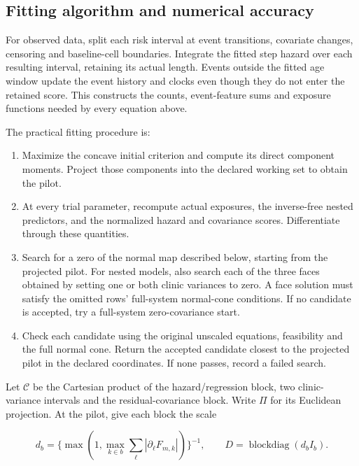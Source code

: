 \documentclass[11pt]{article}
\begin{document}
\subsection{Fitting algorithm and numerical accuracy}\label{sec:3.7}

For observed data, split each risk interval at event transitions, covariate changes, censoring and baseline-cell boundaries. Integrate the fitted step hazard over each resulting interval, retaining its actual length. Events outside the fitted age window update the event history and clocks even though they do not enter the retained score. This constructs the counts, event-feature sums and exposure functions needed by every equation above.

The practical fitting procedure is:

\begin{enumerate}
  \item Maximize the concave initial criterion and compute its direct component moments. Project those components into the declared working set to obtain the pilot.
  \item At every trial parameter, recompute actual exposures, the inverse-free nested predictors, and the normalized hazard and covariance scores. Differentiate through these quantities.
  \item Search for a zero of the normal map described below, starting from the projected pilot. For nested models, also search each of the three faces obtained by setting one or both clinic variances to zero. A face solution must satisfy the omitted rows' full-system normal-cone conditions. If no candidate is accepted, try a full-system zero-covariance start.
  \item Check each candidate using the original unscaled equations, feasibility and the full normal cone. Return the accepted candidate closest to the projected pilot in the declared coordinates. If none passes, record a failed search.
\end{enumerate}

Let \(\mathcal C\) be the Cartesian product of the hazard/regression block, two clinic-variance intervals and the residual-covariance block. Write \(\Pi\) for its Euclidean projection. At the pilot, give each block the scale

\begin{equation*}
d_b=\{\max(1,\max_{k\in b}\sum_\ell |\partial_\ell F_{m,k}|)\}^{-1},\qquad D=\operatorname{blockdiag}(d_b I_b).\tag{38}\label{eq:38}
\end{equation*}
\end{document}
